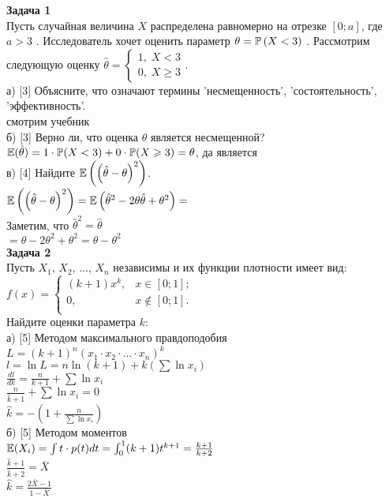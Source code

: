 \documentclass[pdftex,12pt,a4paper]{article}
\begin{document}
{\bf Задача 1} \\
Пусть случайная величина  $X$  распределена
равномерно на отрезке $\left[0;a\right]$, где  $a>3$ .
Исследователь хочет оценить параметр  $\theta =\P\left(X<3\right)$
. Рассмотрим следующую оценку $\hat{\theta
}=\left\{\begin{array}{l} {1,\; X<3} \\ {0,\; X\ge 3}
\end{array}\right. $. \\
а) [3] Объясните, что означают термины 'несмещенность',
'состоятельность', 'эффективность'. \\
смотрим учебник \\
б) [3] Верно ли, что оценка $\hat{\theta}$ является несмещенной? \\
$\E(\hat{\theta})=1\cdot \P(X<3)+0\cdot \P(X \ge 3)=\theta$, да
является \\
 в) [4] Найдите $\E\left(\left(\hat{\theta }-\theta \right)^{2}
\right)$. \\
$\E\left(\left(\hat{\theta }-\theta \right)^{2} \right)=
\E\left(\hat{\theta}^{2}-2\theta\hat{\theta}+\theta^{2}\right)=$ \\
Заметим, что $\hat{\theta}^{2}=\hat{\theta}$ \\
$=\theta-2\theta^{2}+\theta^{2}=\theta-\theta^{2}$ \\


{\bf Задача 2} \\
Пусть $X_{1}$, $X_{2}$, ..., $X_{n}$ независимы и их функции
плотности имеет вид: \\
$ f(x)=
\left\{%
\begin{array}{ll}
    (k+1)x^{k}, & x \in [0;1]; \\
    0, & x \notin [0;1]. \\
\end{array}%
\right.     $ \\
Найдите оценки параметра $k$: \\
а) [5] Методом максимального правдоподобия \\
$L=(k+1)^{n}(x_{1}\cdot x_{2} \cdot...\cdot x_{n})^{k}$ \\
$l=\ln{L}=n\ln(k+1)+k(\sum \ln{x_{i}})$ \\
$\frac{dl}{dk}=\frac{n}{k+1}+\sum \ln{x_{i}}$ \\
$\frac{n}{\hat{k}+1}+\sum \ln{x_{i}}=0$ \\
$\hat{k}=-\left(1+\frac{n}{\sum \ln{x_{i}}} \right)$ \\
б) [5] Методом моментов \\
$\E(X_{i})=\int t\cdot p(t)dt=\int_{0}^{1}
(k+1)t^{k+1}=\frac{k+1}{k+2}$ \\
$\frac{\hat{k}+1}{\hat{k}+2}=\bar{X}$ \\
$\hat{k}=\frac{2\bar{X}-1}{1-\bar{X}}$ \\
\end{document}
